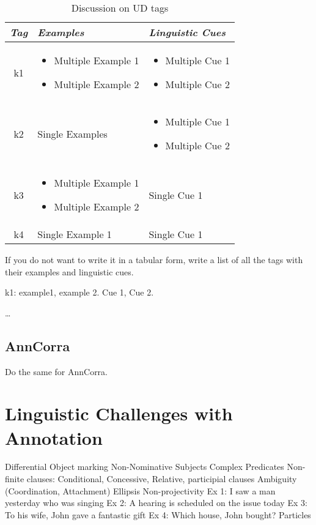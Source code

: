 \documentclass[a4 paper]{article}
\begin{document}
\begin{table}[h]
\centering
\begin{tabular}{|c|p{}|p{}|}
\hline
\textit{Tag} & \textit{Examples} & \textit{Linguistic Cues} \\ 
\hline
k1 & \begin{itemize} 
  \item Multiple Example 1
  \item Multiple Example 2
  \end{itemize}
  & \begin{itemize} 
  \item Multiple Cue 1
  \item Multiple Cue 2
  \end{itemize} \\
  \hline
k2 & Single Examples & \begin{itemize} 
  \item Multiple Cue 1
  \item Multiple Cue 2
  \end{itemize} \\
  \hline
k3 & \begin{itemize} 
  \item Multiple Example 1
  \item Multiple Example 2
  \end{itemize}
  & Single Cue 1 \\
  \hline
k4 & Single Example 1 & Single Cue 1 \\
\hline
\end{tabular}
\caption{Discussion on UD tags}
\end{table}

If you do not want to write it in a tabular form, write a list of all the tags with their examples and linguistic cues.

 k1: example1, example 2. Cue 1, Cue 2.

 \dots

\subsection{AnnCorra}
Do the same for AnnCorra.

\section{Linguistic Challenges with Annotation}

 Differential Object marking
 Non-Nominative Subjects
 Complex Predicates
 Non-finite clauses: Conditional, Concessive, Relative, participial clauses
 Ambiguity (Coordination, Attachment)
 Ellipsis
 Non-projectivity
	Ex 1: I saw a man yesterday who was singing
	Ex 2: A hearing is scheduled on the issue today
	Ex 3: To his wife, John gave a fantastic gift
	Ex 4: Which house, John bought?
 Particles
\end{document}
